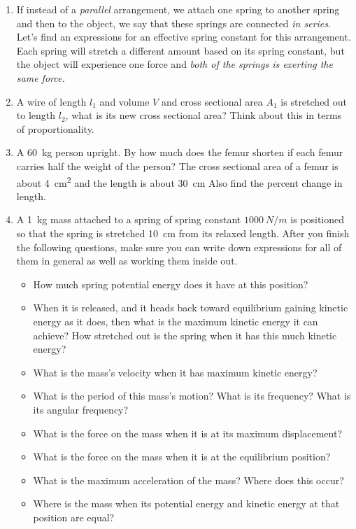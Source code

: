 \begin{enumerate}
\item
If instead of a \emph{parallel} arrangement, we attach one spring to another spring and then to the object, we say that these springs are connected \emph{in series}. Let's find an expressions for an effective spring constant for this arrangement. Each spring will stretch a different amount based on its spring constant, but the object will experience one force and \emph{both of the springs is exerting the same force.} \bigskip

\item
A wire of length $l_1$ and volume $V$ and cross sectional area $A_1$ is stretched out to length $l_2$, what is its new cross sectional area? Think about this in terms of proportionality.

\item
A \SI{60}{kg} person upright. By how much does the femur shorten if each femur carries half the weight of the person? The cross sectional area of a femur is about \SI{4}{cm^2} and the length is about \SI{30}{cm} Also find the percent change in length. 

\item
A \SI{1}{kg} mass attached to a spring of spring constant $\SI{1000}{N/m}$ is positioned so that the spring is stretched \SI{10}{cm} from its relaxed length. After you finish the following questions, make sure you can write down expressions for all of them in general as well as working them inside out.
\begin{itemize}
	\setlength\itemsep{1 in}
	\item How much spring potential energy does it have at this position?
	\item When it is released, and it heads back toward equilibrium gaining kinetic energy as it does, then what is the maximum kinetic energy it can achieve? How stretched out is the spring when it has this much kinetic energy? 
	\item What is the mass's velocity when it has maximum kinetic energy?
	\item What is the period of this mass's motion? What is its frequency? What is its angular frequency?
	\item What is the force on the mass when it is at its maximum displacement?
	\item What is the force on the mass when it is at the equilibrium position?
	\item What is the maximum acceleration of the mass? Where does this occur?
	\item Where is the mass when its potential energy and kinetic energy at that position are equal?
\end{itemize}


\end{enumerate}
